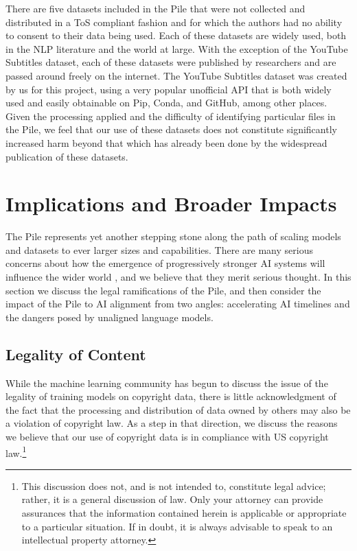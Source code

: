 There are five datasets included in the Pile that were not collected and distributed in a ToS compliant fashion and for which the authors had no ability to consent to their data being used. Each of these datasets are widely used, both in the NLP literature and the world at large. With the exception of the YouTube Subtitles dataset, each of these datasets were published by researchers and are passed around freely on the internet. The YouTube Subtitles dataset was created by us for this project, using a very popular unofficial API that is both widely used and easily obtainable on Pip, Conda, and GitHub, among other places. Given the processing applied and the difficulty of identifying particular files in the Pile, we feel that our use of these datasets does not constitute significantly increased harm beyond that which has already been done by the widespread publication of these datasets.

\section{Implications and Broader Impacts}

The Pile represents yet another stepping stone along the path of scaling models and datasets to ever larger sizes and capabilities. There are many serious concerns about how the emergence of progressively stronger AI systems will influence the wider world \citep{brundage_malicious_2018,amodei_concrete_2016,bostrom2014ethics,bostrom2014superintelligence,critch2020ai}, and we believe that they merit serious thought. In this section we discuss the legal ramifications of the Pile, and then consider the impact of the Pile to AI alignment from two angles: accelerating AI timelines and the dangers posed by unaligned language models.

\subsection{Legality of Content}\label{subsec:law}

While the machine learning community has begun to discuss the issue of the legality of training models on copyright data, there is little acknowledgment of the fact that the processing and distribution of data owned by others may also be a violation of copyright law. As a step in that direction, we discuss the reasons we believe that our use of copyright data is in compliance with US copyright law.\footnote{This discussion does not, and is not intended to, constitute legal advice; rather, it is a general discussion of law. Only your attorney can provide assurances that the information contained herein is applicable or appropriate to a particular situation. If in doubt, it is always advisable to speak to an intellectual property attorney.}

